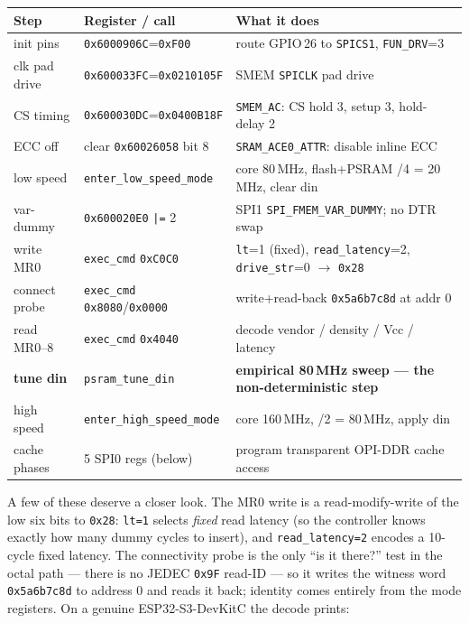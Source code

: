 \begin{longtable}{p{2.4cm} p{4.2cm} p{5.4cm}}
\toprule
\textbf{Step} & \textbf{Register / call} & \textbf{What it does} \\ \midrule
\endhead
init pins      & \texttt{0x6000906C}=\texttt{0xF00}        & route GPIO\,26 to \texttt{SPICS1}, \texttt{FUN\_DRV}=3 \\
clk pad drive  & \texttt{0x600033FC}=\texttt{0x0210105F}   & SMEM \texttt{SPICLK} pad drive \\
CS timing      & \texttt{0x600030DC}=\texttt{0x0400B18F}   & \texttt{SMEM\_AC}: CS hold 3, setup 3, hold-delay 2 \\
ECC off        & clear \texttt{0x60026058} bit 8           & \texttt{SRAM\_ACE0\_ATTR}: disable inline ECC \\
low speed      & \texttt{enter\_low\_speed\_mode}          & core 80\,MHz, flash+PSRAM /4 = 20\,MHz, clear din \\
var-dummy      & \texttt{0x600020E0} \verb#|=# 2           & SPI1 \texttt{SPI\_FMEM\_VAR\_DUMMY}; no DTR swap \\
write MR0      & \texttt{exec\_cmd} \texttt{0xC0C0}        & \texttt{lt}=1 (fixed), \texttt{read\_latency}=2, \texttt{drive\_str}=0 $\rightarrow$ \texttt{0x28} \\
connect probe  & \texttt{exec\_cmd} \texttt{0x8080}/\texttt{0x0000} & write+read-back \texttt{0x5a6b7c8d} at addr 0 \\
read MR0--8    & \texttt{exec\_cmd} \texttt{0x4040}        & decode vendor / density / Vcc / latency \\
\textbf{tune din} & \texttt{psram\_tune\_din}              & \textbf{empirical 80\,MHz sweep --- the non-deterministic step} \\
high speed     & \texttt{enter\_high\_speed\_mode}         & core 160\,MHz, /2 = 80\,MHz, apply din \\
cache phases   & 5 SPI0 regs (below)                       & program transparent OPI-DDR cache access \\
\bottomrule
\end{longtable}

A few of these deserve a closer look. The MR0 write is a read-modify-write of the
low six bits to \texttt{0x28}: \texttt{lt=1} selects \emph{fixed} read latency (so
the controller knows exactly how many dummy cycles to insert), and
\texttt{read\_latency=2} encodes a 10-cycle fixed latency. The connectivity probe is
the only ``is it there?'' test in the octal path --- there is no JEDEC \texttt{0x9F}
read-ID --- so it writes the witness word \texttt{0x5a6b7c8d} to address 0 and reads
it back; identity comes entirely from the mode registers. On a genuine
ESP32-S3-DevKitC the decode prints:

